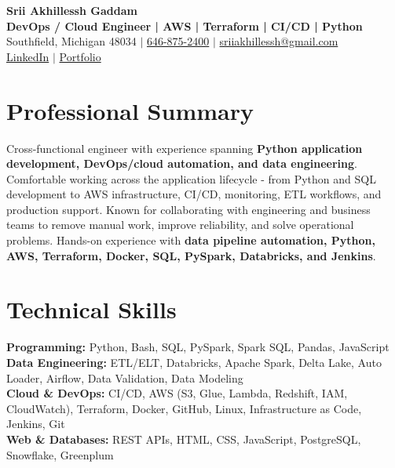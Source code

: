 \documentclass[letterpaper,10pt]{article}
\begin{document}
\fontsize{9.35pt}{10.45pt}\selectfont

\begin{center}
    {\LARGE \textbf{Srii Akhillessh Gaddam}} \\[-1pt]
    \textbf{DevOps / Cloud Engineer | AWS | Terraform | CI/CD | Python} \\[2pt]
    Southfield, Michigan 48034 $|$
    \href{tel:6468752400}{646-875-2400} $|$
    \href{mailto:sriiakhillessh@gmail.com}{sriiakhillessh@gmail.com} \\[1pt]
    \href{https://www.linkedin.com/in/srii-akhiilessh-gaddam-b48668191/}{LinkedIn} $|$
    \href{https://sriiakhillesshg.github.io/portfolio/}{Portfolio}
\end{center}
\vspace{-8pt}

\section{Professional Summary}
\small{Cross-functional engineer with experience spanning \textbf{Python application development, DevOps/cloud automation, and data engineering}. Comfortable working across the application lifecycle - from Python and SQL development to AWS infrastructure, CI/CD, monitoring, ETL workflows, and production support. Known for collaborating with engineering and business teams to remove manual work, improve reliability, and solve operational problems. Hands-on experience with \textbf{data pipeline automation, Python, AWS, Terraform, Docker, SQL, PySpark, Databricks, and Jenkins}.}

\section{Technical Skills}
\small{
\textbf{Programming:} Python, Bash, SQL, PySpark, Spark SQL, Pandas, JavaScript \\
\textbf{Data Engineering:} ETL/ELT, Databricks, Apache Spark, Delta Lake, Auto Loader, Airflow, Data Validation, Data Modeling \\
\textbf{Cloud \& DevOps:} CI/CD, AWS (S3, Glue, Lambda, Redshift, IAM, CloudWatch), Terraform, Docker, GitHub, Linux, Infrastructure as Code, Jenkins, Git \\
\textbf{Web \& Databases:} REST APIs, HTML, CSS, JavaScript, PostgreSQL, Snowflake, Greenplum
}
\end{document}
